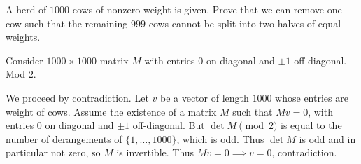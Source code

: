 \begin{problem}
	\gim
	A herd of $1000$ cows of nonzero weight is given.
	Prove that we can remove one cow such that the
	remaining $999$ cows cannot be split
	into two halves of equal weights.
	\begin{hint}
		Consider $1000 \times 1000$ matrix $M$
		with entries $0$ on diagonal and $\pm 1$ off-diagonal.
		Mod $2$.
	\end{hint}
	\begin{sol}
		We proceed by contradiction.
		Let $v$ be a vector of length $1000$
		whose entries are weight of cows.
		Assume the existence of a matrix $M$ such that $Mv = 0$,
		with entries $0$ on diagonal and $\pm 1$ off-diagonal.
		But $\det M \pmod 2$ is equal to the number of derangements
		of $\{1, \dots, 1000\}$, which is odd.
		Thus $\det M$ is odd and in particular not zero,
		so $M$ is invertible.
		Thus $Mv = 0 \implies v = 0$, contradiction.
	\end{sol}
\end{problem}

